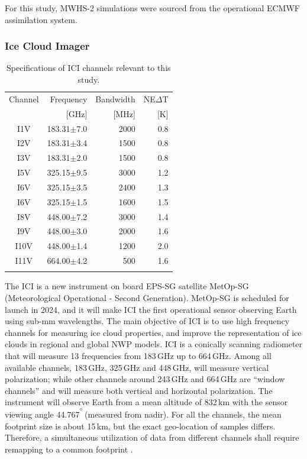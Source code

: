 \documentclass[amt, manuscript]{copernicus}
\begin{document}
For this study, MWHS-2 simulations were sourced from the operational ECMWF assimilation system.

\subsubsection{Ice Cloud Imager}
%
\begin{table}[t]	
	\caption{Specifications of ICI channels relevant to this study.}
	\label{tab:ICI_MWI_channels}
	\begin{tabular}{crrr}
		\tophline
		Channel & Frequency 	& Bandwidth  	&NE$\Delta$T	\\
				& [GHz]			& [MHz]			& [K]			\\
		\middlehline
		I1V&	183.31$\pm$7.0    & 2000 			& 0.8 		\\
		I2V&	183.31$\pm$3.4    & 1500 			& 0.8 		\\
		I3V&	183.31$\pm$2.0    & 1500			& 0.8 		\\
		I5V&	325.15$\pm$9.5    & 3000			& 1.2 		\\
		I6V&	325.15$\pm$3.5    & 2400			& 1.3 		\\
		I6V&	325.15$\pm$1.5    & 1600			& 1.5 		\\
		I8V&	448.00$\pm$7.2    & 3000			& 1.4 		\\
		I9V&	448.00$\pm$3.0    & 2000			& 1.6 		\\
		I10V&	448.00$\pm$1.4    & 1200			& 2.0 		\\
		I11V&	664.00$\pm$4.2    & \phantom{0}500	& 1.6 		\\		
		\bottomhline
	\end{tabular}
	\belowtable{} %
\end{table}

The ICI is a new instrument on board EPS-SG satellite MetOp-SG (Meteorological Operational - Second Generation). MetOp-SG is scheduled for launch in 2024, and it will make ICI the first operational sensor observing Earth using sub-mm wavelengths. The main objective of ICI is to use high frequency channels for measuring ice cloud properties, and improve the representation of ice clouds in regional and global NWP models. ICI is a conically scanning radiometer that will measure 13 frequencies from 183\,GHz up to 664\,GHz.  Among all available channels, 183\,GHz, 325\,GHz and 448\,GHz, will measure vertical polarization;  while other channels around 243\,GHz and 664\,GHz are ``window channels'' and will measure both vertical and horizontal polarization. The instrument will observe Earth from a mean altitude of 832\,km with the sensor viewing angle 44.767$^\unit{^{\degree}}$(measured from nadir). For all the channels, the mean footprint size is about 15\,km, but the exact geo-location of samples differs. Therefore, a simultaneous utilization of data from different channels shall require remapping to a common footprint \citep{eriksson:towar:20}.
\end{document}
